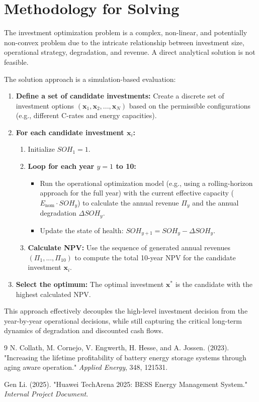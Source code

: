\documentclass[11pt, a4paper]{article}
\begin{document}
\section{Methodology for Solving}
The investment optimization problem is a complex, non-linear, and potentially non-convex problem due to the intricate relationship between investment size, operational strategy, degradation, and revenue. A direct analytical solution is not feasible.

The solution approach is a simulation-based evaluation:
\begin{enumerate}
    \item \textbf{Define a set of candidate investments:} Create a discrete set of investment options $(\mathbf{x}_1, \mathbf{x}_2, ..., \mathbf{x}_N)$ based on the permissible configurations (e.g., different C-rates and energy capacities).
    \item \textbf{For each candidate investment $\mathbf{x}_i$:}
    \begin{enumerate}
        \item Initialize $SOH_1 = 1$.
        \item \textbf{Loop for each year $y=1$ to 10:}
        \begin{itemize}
            \item Run the operational optimization model (e.g., using a rolling-horizon approach for the full year) with the current effective capacity ($E_{\text{nom}} \cdot SOH_y$) to calculate the annual revenue $\Pi_y$ and the annual degradation $\Delta SOH_y$.
            \item Update the state of health: $SOH_{y+1} = SOH_y - \Delta SOH_y$.
        \end{itemize}
        \item \textbf{Calculate NPV:} Use the sequence of generated annual revenues $(\Pi_1, ..., \Pi_{10})$ to compute the total 10-year NPV for the candidate investment $\mathbf{x}_i$.
    \end{enumerate}
    \item \textbf{Select the optimum:} The optimal investment $\mathbf{x}^*$ is the candidate with the highest calculated NPV.
\end{enumerate}
This approach effectively decouples the high-level investment decision from the year-by-year operational decisions, while still capturing the critical long-term dynamics of degradation and discounted cash flows.

\begin{thebibliography}{9}
N. Collath, M. Cornejo, V. Engwerth, H. Hesse, and A. Jossen. (2023). "Increasing the lifetime profitability of battery energy storage systems through aging aware operation." \textit{Applied Energy}, 348, 121531.

Gen Li. (2025). "Huawei TechArena 2025: BESS Energy Management System." \textit{Internal Project Document}.
\end{thebibliography}
\end{document}
